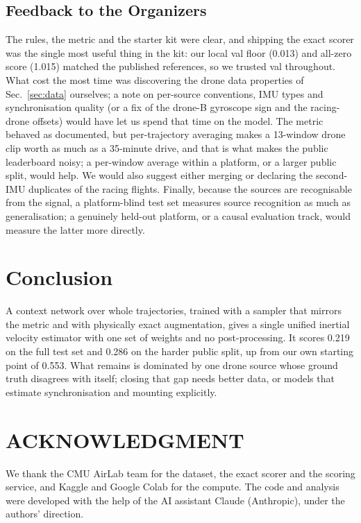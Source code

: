 \documentclass[letterpaper,10pt,conference]{ieeeconf}
\begin{document}
\subsection{Feedback to the Organizers}
The rules, the metric and the starter kit were clear, and shipping the exact scorer was the single most useful
thing in the kit: our local val floor (0.013) and all-zero score (1.015) matched the published references, so we
trusted val throughout. What cost the most time was discovering the drone data properties of Sec.~\ref{sec:data}
ourselves; a note on per-source conventions, IMU types and synchronisation quality (or a fix of the drone-B
gyroscope sign and the racing-drone offsets) would have let us spend that time on the model. The metric behaved as
documented, but per-trajectory averaging makes a 13-window drone clip worth as much as a 35-minute drive, and that is
what makes the public leaderboard noisy; a per-window average within a platform, or a larger public split, would
help. We would also suggest either merging or declaring the second-IMU duplicates of the racing flights. Finally,
because the sources are recognisable from the signal, a platform-blind test set measures source recognition as much
as generalisation; a genuinely held-out platform, or a causal evaluation track, would measure the latter more
directly.

\section{Conclusion}
A context network over whole trajectories, trained with a sampler that mirrors the metric and with physically exact
augmentation, gives a single unified inertial velocity estimator with one set of weights and no post-processing. It
scores 0.219 on the full test set and 0.286 on the harder public split, up from our own starting point of 0.553.
What remains is dominated by one drone source whose ground truth disagrees with itself; closing that gap needs
better data, or models that estimate synchronisation and mounting explicitly.

\section*{ACKNOWLEDGMENT}
We thank the CMU AirLab team for the dataset, the exact scorer and the scoring service, and Kaggle and Google Colab
for the compute. The code and analysis were developed with the help of the AI assistant Claude (Anthropic), under
the authors' direction.
\end{document}
